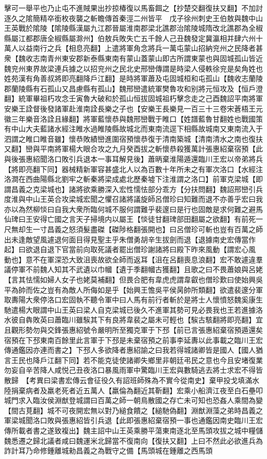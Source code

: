 擊可一舉平也乃止屯不進賊果出抄掠椿復以馬畜餌之【抄楚交翻復扶又翻】不加討逐久之隂簡精卒銜枚夜襲之斬瞻傳首秦涇二州皆平　戊子徐州刺史王伯敖與魏中山王英戰於隂陵【隂陵縣漢屬九江郡晉屬淮南郡梁北譙郡治隂陵城隋改北譙郡為全椒縣屬江都郡唐全椒縣屬滁州】伯敖兵敗失亡五千餘人己丑魏發定冀瀛相并肆六州十萬人以益南行之兵【相息亮翻】上遣將軍角念將兵一萬屯蒙山招納兖州之民降者甚衆【魏收志南青州東安郡新泰縣東南有蒙山蓋蒙山即古所謂東蒙也與固城孤山皆近魏兖州東界故梁連兵據之以招兖州之民北史邢巒傳謂是時梁人侵軼徐兖是矣角姓也姓苑漢有角善叔將即亮翻降戶江翻】是時將軍蕭及屯固城桓和屯孤山【魏收志蘭陵郡蘭陵縣有石孤山又昌慮縣有孤山】魏邢巒遣統軍樊魯攻和别將元恒攻及【恒戶澄翻】統軍畢祖朽攻念壬寅魯大破和於孤山恒拔固城祖朽擊念走之己酉魏詔平南將軍安樂王詮督後發諸軍赴淮南詮長樂之子也【安樂王長樂見一百三十三卷宋蒼梧王元徽三年樂音洛詮且緣翻】將軍藍懷恭與魏邢巒戰于睢口【姓譜藍魯甘翻姓也戰國策有中山大夫藍諸水經注睢水過睢陵縣故城北而東南流逕下相縣故城南又東南流入于泗謂之睢口睢音雖】懷恭敗績巒進圍宿預懷恭復于清南築城【清南清水之南也復扶又翻】巒與平南將軍楊大眼合攻之九月癸酉拔之斬懷恭殺獲萬計張惠紹棄宿預【此與後張惠紹聞洛口敗引兵退本一事耳解見後】蕭昞棄淮陽遁還臨川王宏以帝弟將兵【將即亮翻下同】器械精新軍容甚盛北人以為百數十年所未之有軍次洛口【水經注洛澗在西曲陽縣北劉牢之斬秦將梁成處北歷秦墟下注淮謂之洛口】前軍克梁城【即謂昌義之克梁城也】諸將欲乘勝深入宏性懦怯部分乖方【分扶問翻】魏詔邢巒引兵度淮與中山王英合攻梁城宏聞之懼召諸將議旋師呂僧珍曰知難而退不亦善乎宏曰我亦以為然柳惔曰自我大衆所臨何城不服何謂難乎裴邃曰是行也固敵是求何難之避馬仙琕曰王安得亡國之言天子掃境内以屬王【惔徒甘翻琕部田翻屬之欲翻】有前死一尺無却生一寸昌義之怒須髮盡磔【磔陟格翻張開也】曰呂僧珍可斬也豈有百萬之師出未逢敵望風遽退何面目得見聖主乎朱僧勇胡辛生拔劍而退【退據南史宏傳當作起】曰欲退自退下官當前向取死議者罷出僧珍謝諸將曰殿下昨來風動【謂宏心風動也】意不在軍深恐大致沮喪故欲全師而返耳【沮在呂翻喪息浪翻】宏不敢遽違羣議停軍不前魏人知其不武遺以巾幗【遺于季翻幗古獲翻】且歌之曰不畏蕭娘與呂姥【言其怯懦如婦人女子也姥莫補翻】但畏合肥有韋虎虎謂韋叡也僧珍歎曰使始興吳平為帥而佐之豈有為敵人所侮如是乎【始興王憺吳平侯昺帥所類翻】欲遣裴邃分軍取夀陽大衆停洛口宏固執不聽令軍中曰人馬有前行者斬於是將士人懷憤怒魏奚康生馳遣楊大眼謂中山王英曰梁人自克梁城已後久不進軍其勢可見必畏我也王若進據洛水彼自犇敗英曰蕭臨川雖騃其下有良將韋裴之屬未可輕也【騃古駭翻將即亮翻】宜且觀形勢勿與交鋒張惠紹號令嚴明所至獨克軍于下邳【前已言張惠紹棄宿預遁還矣宿預在下邳東南百餘里此言軍于下邳是未棄宿預之前事李延夀以此事載之臨川王宏傳通鑑因亦連而書之】下邳人多欲降者惠紹諭之曰我若得城諸卿皆是國人【國人猶言王民也降戶江翻下同】若不能克徒使諸卿失鄉里非朝廷弔民之意也今且安堵復業勿妄自辛苦降人咸悦己丑夜洛口暴風雨軍中驚臨川王宏與數騎逃去將士求宏不得皆散歸　【考異曰梁書宏傳云會征役久有詔班師殊為不實今從南史】棄甲投戈填滿水陸捐棄病者及羸老死者近五萬人【羸倫為翻近其靳翻】宏乘小船濟江夜至白石壘叩城門求入臨汝侯淵猷登城謂曰百萬之師一朝鳥散國之存亡未可知也恐姦人乘間為變【間古莧翻】城不可夜開宏無以對乃縋食饋之【縋馳偽翻】淵猷淵藻之弟時昌義之軍梁城聞洛口敗與張惠紹皆引兵退【此即張惠紹棄宿預一事也通鑑因南史臨川王宏傳所載者書之遂致複出】魏主詔中山王英乘勝平蕩東南逐北至馬頭攻拔之城中糧儲魏悉遷之歸北議者咸曰魏運米北歸當不復南向【復扶又翻】上曰不然此必欲進兵為詐計耳乃命修鍾離城勑昌義之為戰守之備【馬頭城在鍾離之西馬頭